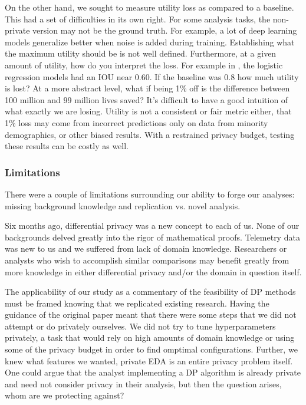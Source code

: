 \documentclass[12pt,letterpaper]{article}
\begin{document}
On the other hand, we sought to measure utility loss as compared to a baseline. This had a set of difficulties in its own right. For some analysis tasks, the non-private version may not be the ground truth. For example, a lot of deep learning models generalize better when noise is added during training. Establishing what the maximum utility should be is not well defined. Furthermore, at a given amount of utility, how do you interpret the loss. For example in \cite{qtr1proj}, the logistic regression models had an IOU near 0.60. If the baseline was 0.8 how much utility is lost? At a more abstract level, what if being 1\% off is the difference between 100 million and 99 million lives saved? It's difficult to have a good intuition of what exactly we are losing. Utility is not a consistent or fair metric either, that 1\% loss may come from incorrect predictions only on data from minority demographics, or other biased results. With a restrained privacy budget, testing these results can be costly as well.

\subsubsection{Limitations}
There were a couple of limitations surrounding our ability to forge our analyses: missing background knowledge and replication vs. novel analysis.

Six months ago, differential privacy was a new concept to each of us. None of our backgrounds delved greatly into the rigor of mathematical proofs. Telemetry data was new to us and we suffered from lack of domain knowledge. Researchers or analysts who wish to accomplish similar comparisons may benefit greatly from more knowledge in either differential privacy and/or the domain in question itself. 

The applicability of our study as a commentary of the feasibility of DP methods must be framed knowing that we replicated existing research. Having the guidance of the original paper meant that there were some steps that we did not attempt or do privately ourselves. We did not try to tune hyperparameters privately, a task that would rely on high amounts of domain knowledge or using some of the privacy budget in order to find omptimal configurations. Further, we knew what features we wanted, private EDA is an entire privacy problem itself. One could argue that the analyst implementing a DP algorithm is already private and need not consider privacy in their analysis, but then the question arises, whom are we protecting against?
\end{document}
